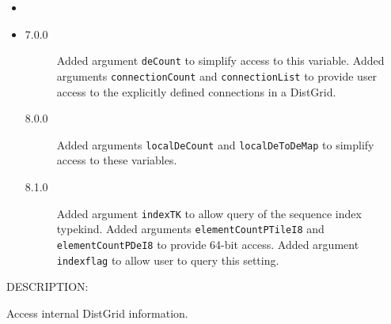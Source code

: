    \begin{itemize}
   \item{}
   \item{}
   \begin{description}
   \item[7.0.0] Added argument {\tt deCount} to simplify access to this 
                variable. \newline
                Added arguments {\tt connectionCount} and {\tt connectionList}
                to provide user access to the explicitly defined connections in
                a DistGrid.
   \item[8.0.0] Added arguments {\tt localDeCount} and {\tt localDeToDeMap}
                to simplify access to these variables.
   \item[8.1.0] Added argument {\tt indexTK} to allow query of the sequence index
                typekind.\newline
                Added arguments {\tt elementCountPTileI8} and
                {\tt elementCountPDeI8} to provide 64-bit access.\newline
                Added argument {\tt indexflag} to allow user to query this
                setting.
   \end{description}
   \end{itemize}
           
{\sf DESCRIPTION:\\ }


     Access internal DistGrid information.
  
